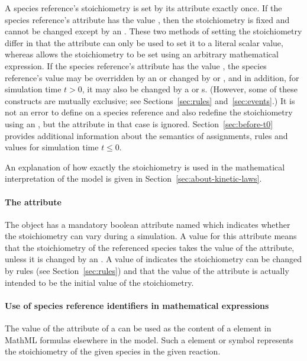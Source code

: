 A species reference's stoichiometry is set by its  
attribute exactly once.  If the species reference's  
attribute has the value
, then the stoichiometry is fixed and cannot be
changed except by an \InitialAssignment.  These two methods of
setting the stoichiometry differ in that the 
attribute can only be used to set it to a literal scalar value,
whereas \InitialAssignment allows the stoichiometry to be set using an
arbitrary mathematical expression.  If the species reference's
 attribute has the value , the species reference's
value may be overridden by an \InitialAssignment or changed by
\AssignmentRule or \AlgebraicRule, and in addition, for simulation
time $t > 0$, it may also be changed by a \RateRule or \Event{}s.
(However, some of these constructs are mutually exclusive; see
Sections~\ref{sec:rules} and~\ref{sec:events}.)  It is not an
error to define  on a species reference and also 
redefine the stoichiometry using an \InitialAssignment, but the 
 attribute in that case is ignored.  
Section~\ref{sec:before-t0} provides additional
information about the semantics of assignments, rules and values
for simulation time $t \leq 0$.

An explanation of how exactly the stoichiometry is used in the mathematical interpretation 
of the model is given in Section~\ref{sec:about-kinetic-laws}.


\paragraph{The  attribute}

The \SpeciesReference object has a mandatory boolean attribute named
 which indicates whether the stoichiometry can
vary during a simulation. A value  for this attribute means that 
the stoichiometry of the referenced species takes the value of the 
 attribute, unless it is changed by an \InitialAssignment.
A value of  indicates the stoichiometry 
can be changed by rules (see Section~\ref{sec:rules}) and
that the value of the  attribute is actually intended to be the initial
value of the stoichiometry.

\paragraph{Use of species reference identifiers in mathematical expressions}
\label{sec:reaction:speciesReferences-in-mathematical-expressions}
The value of the  attribute of a \SpeciesReference can be
used as the content of a  element in MathML formulas
elsewhere in the model. Such a  element or symbol
represents the stoichiometry of the given species in the given reaction.

